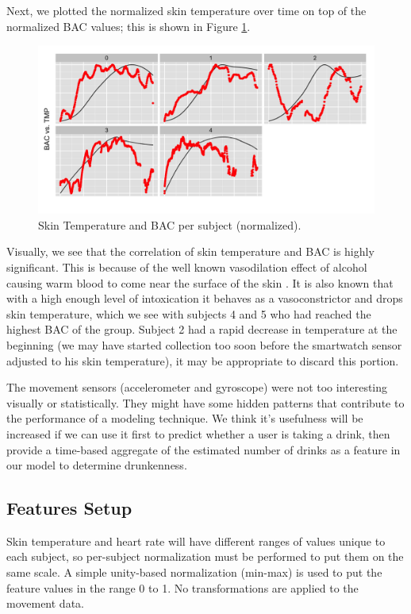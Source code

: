 Next, we plotted the normalized skin temperature over time on top of the normalized BAC values; this is shown in Figure \ref{fig:skin_temperatures}. \begin{figure}
	\includegraphics[width=1.0\textwidth]{../figs/skin_temperatures}
	\caption{Skin Temperature and BAC per subject (normalized).}
	\label{fig:skin_temperatures}
\end{figure}Visually, we see that the correlation of skin temperature and BAC is highly significant. This is because of the well known vasodilation effect of alcohol causing warm blood to come near the surface of the skin \cite{Dekker:1999}. It is also known that with a high enough level of intoxication it behaves as a vasoconstrictor and drops skin temperature, which we see with subjects 4 and 5 who had reached the highest BAC of the group. Subject 2 had a rapid decrease in temperature at the beginning (we may have started collection too soon before the smartwatch sensor adjusted to his skin temperature), it may be appropriate to discard this portion.

The movement sensors (accelerometer and gyroscope) were not too interesting visually or statistically. They might have some hidden patterns that contribute to the performance of a modeling technique. We think it's usefulness will be increased if we can use it first to predict whether a user is taking a drink, then provide a time-based aggregate of the estimated number of drinks as a feature in our model to determine drunkenness.

\subsection{Features Setup}

Skin temperature and heart rate will have different ranges of values unique to each subject, so per-subject normalization must be performed to put them on the same scale. A simple unity-based normalization (min-max) is used to put the feature values in the range 0 to 1. No transformations are applied to the movement data.

